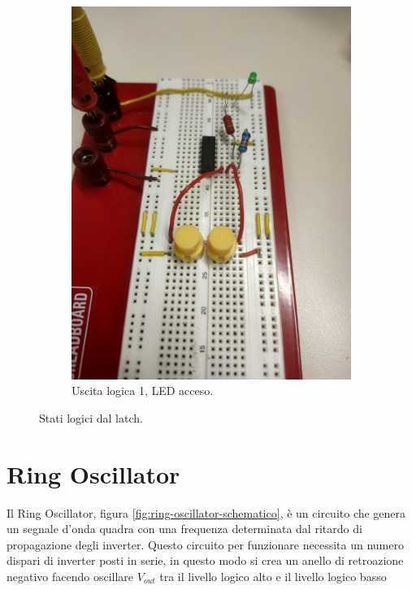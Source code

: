 \documentclass[a4paper,12pt]{article}
\begin{document}
\begin{figure}[h]
\begin{subfigure}[b]{0.45\textwidth}
		\includegraphics[width=\linewidth]{immagini/latch/on.png}
		\caption{Uscita logica 1, LED acceso.}
	\end{subfigure}
	\caption{Stati logici  dal latch.}
	\label{fig:latch_onoff}
\end{figure}


\FloatBarrier

\section*{Ring Oscillator}
Il Ring Oscillator, figura \ref{fig:ring-oscillator-schematico}, è un circuito che genera un segnale d'onda quadra con una frequenza determinata dal ritardo di propagazione degli inverter. Questo circuito per funzionare necessita un numero dispari di inverter posti in serie, in questo modo si crea un anello di retroazione negativo facendo oscillare $V_{out}$ tra il livello logico alto e il livello logico basso
\end{document}
